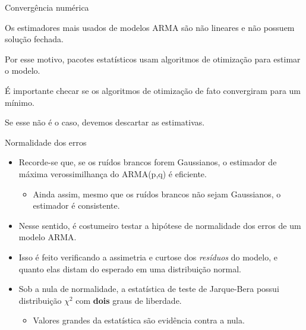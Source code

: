 \documentclass[11pt]{beamer}
\newenvironment{halfwideitemize}{\itemize\addtolength{\itemsep}{0.5em}}{\enditemize}
\begin{document}
\begin{frame}{Convergência numérica}
	\begin{halfwideitemize}
		\item Os estimadores mais usados de modelos ARMA são não lineares e não possuem solução fechada.
		\begin{halfwideitemize}
			\item Por esse motivo, pacotes estatísticos usam algoritmos de otimização para estimar o modelo.  
		\end{halfwideitemize}
		\item É importante checar se os algoritmos de otimização de fato convergiram para um mínimo.
		\begin{halfwideitemize}
			\item Se esse não é o caso, devemos descartar as estimativas.
		\end{halfwideitemize}
		
	\end{halfwideitemize}
	

\end{frame}
	\begin{frame}{Normalidade dos erros}
		\begin{itemize}
			\item Recorde-se que, se os ruídos brancos forem Gaussianos, o estimador de máxima verossimilhança do ARMA(p,q) é eficiente.
			\begin{itemize}
				\item Ainda assim, mesmo que os ruídos brancos não sejam Gaussianos, o estimador é consistente.
			\end{itemize}
			\item Nesse sentido, é costumeiro testar a hipótese de normalidade dos erros de um modelo ARMA.
			\item Isso é feito verificando a assimetria e curtose dos \textit{resíduos} do modelo, e quanto elas distam do esperado em uma distribuição normal.
			\item Sob a nula de normalidade, a estatística de teste de Jarque-Bera possui distribuição $\chi^2$ com \textbf{dois} graus de liberdade.
			\begin{itemize}
				\item Valores grandes da estatística são evidência contra a nula.
			\end{itemize}
		\end{itemize}
\end{frame}
\end{document}
